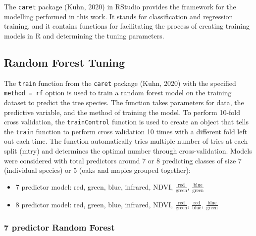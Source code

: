 \documentclass[12pt,twoside]{reedthesis}
\begin{document}
The \texttt{caret} package (Kuhn, 2020) in RStudio provides the framework for the modelling performed in this work. It stands for classification and regression training, and it contains functions for facilitating the process of creating training models in R and determining the tuning parameters.

\hypertarget{random-forest-tuning}{%
\subsection{Random Forest Tuning}\label{random-forest-tuning}}

The \texttt{train} function from the \texttt{caret} package (Kuhn, 2020) with the specified \texttt{method\ =\ rf} option is used to train a random forest model on the training dataset to predict the tree species. The function takes parameters for data, the predictive variable, and the method of training the model. To perform 10-fold cross validation, the \texttt{trainControl} function is used to create an object that tells the \texttt{train} function to perform cross validation 10 times with a different fold left out each time. The function automatically tries multiple number of tries at each split (mtry) and determines the optimal number through cross-validation. Models were considered with total predictors around 7 or 8 predicting classes of size 7 (individual species) or 5 (oaks and maples grouped together):
\begin{itemize}
\item
  7 predictor model: red, green, blue, infrared, NDVI, \(\frac{\mbox{red}}{\mbox{green}}\), \(\frac{\mbox{blue}}{\mbox{green}}\)
\item
  8 predictor model: red, green, blue, infrared, NDVI, \(\frac{\mbox{red}}{\mbox{green}}\), \(\frac{\mbox{red}}{\mbox{blue}}\), \(\frac{\mbox{blue}}{\mbox{green}}\)
\end{itemize}
\hypertarget{predictor-random-forest}{%
\subsubsection{7 predictor Random Forest}\label{predictor-random-forest}}
\end{document}
